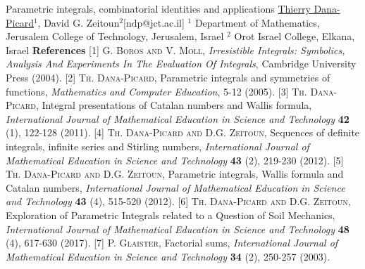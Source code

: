 \begin{abstract_online}{Parametric integrals, combinatorial identities and applications}{%
        \underline{Thierry Dana-Picard}$^{1}$, David G. Zeitoun$^{2}$}{[ndp@jct.ac.il]
        }{%
        $^1$ Department of Mathematics, Jerusalem College of Technology, Jerusalem, Israel \newline{}$^2$ Orot Israel College, Elkana, Israel \newline{}}
\textbf{References} \newline{}
[1] \textsc{G. Boros and V. Moll}, \emph{Irresistible Integrals: Symbolics, Analysis And Experiments In The Evaluation Of Integrals}, Cambridge University Press (2004).\newline{}
[2] \textsc{Th. Dana-Picard}, Parametric integrals and symmetries of functions, \emph{Mathematics and Computer Education}, 5-12 (2005).\newline{}
[3] \textsc{Th. Dana-Picard}, Integral presentations of Catalan numbers and Wallis formula, \emph{International Journal of Mathematical Education in Science and Technology} \textbf{42} (1), 122-128 (2011). \newline{}
[4] \textsc{Th. Dana-Picard and D.G. Zeitoun}, Sequences of definite integrals, infinite series and Stirling numbers, \emph{International Journal of Mathematical Education in Science and Technology} \textbf{43} (2), 219-230 (2012). \newline{}
[5] \textsc{Th. Dana-Picard and D.G. Zeitoun}, Parametric integrals, Wallis formula and Catalan numbers, \emph{International Journal of Mathematical Education in Science and Technology} \textbf{43} (4), 515-520 (2012).\newline{}
[6] \textsc{Th. Dana-Picard and D.G. Zeitoun}, Exploration of Parametric Integrals related to a Question of Soil Mechanics, \emph{International Journal of Mathematical Education in Science and Technology} \textbf{48} (4), 617-630 (2017).\newline{}
[7] \textsc{P. Glaister}, Factorial sums, \emph{International Journal of Mathematical Education in Science and Technology} \textbf{34} (2), 250-257 (2003).
\end{abstract_online}




